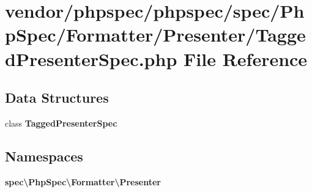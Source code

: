 \section{vendor/phpspec/phpspec/spec/\+Php\+Spec/\+Formatter/\+Presenter/\+Tagged\+Presenter\+Spec.php File Reference}
\label{_tagged_presenter_spec_8php}
\subsection*{Data Structures}
\begin{DoxyCompactItemize}
\item 
class {\bf Tagged\+Presenter\+Spec}
\end{DoxyCompactItemize}
\subsection*{Namespaces}
\begin{DoxyCompactItemize}
\item 
 {\bf spec\textbackslash{}\+Php\+Spec\textbackslash{}\+Formatter\textbackslash{}\+Presenter}
\end{DoxyCompactItemize}
